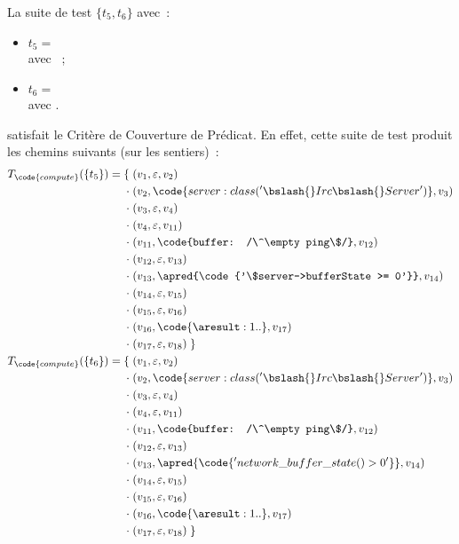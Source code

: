 \begin{example}

La suite de test $\{t_5, t_6\}$ avec~:
%
\begin{itemize}

\item
$t_5 =$  \\
avec ~;

\item
$t_6 =$  \\
avec .

\end{itemize}
%
satisfait le Critère de Couverture de Prédicat. En effet, cette suite de test
produit les chemins suivants (sur les sentiers)~:
%
\begin{align*}
%
T_\code{compute}(\{t_5\}) = \{\;
          & (v_1, \varepsilon, v_2) \\
  \cdot\; & (v_2, \code{server: class('\bslash{}Irc\bslash{}Server')}, v_3) \\
  \cdot\; & (v_3, \varepsilon, v_4) \\
  \cdot\; & (v_4, \varepsilon, v_{11}) \\
  \cdot\; & (v_{11}, \code{buffer: /\^\empty ping\$/}, v_{12}) \\
  \cdot\; & (v_{12}, \varepsilon, v_{13}) \\
  \cdot\; & (v_{13}, \apred{\code{'\$server->bufferState >= 0'}}, v_{14}) \\
  \cdot\; & (v_{14}, \varepsilon, v_{15}) \\
  \cdot\; & (v_{15}, \varepsilon, v_{16}) \\
  \cdot\; & (v_{16}, \code{\aresult: 1..}, v_{17}) \\
  \cdot\; & (v_{17}, \varepsilon, v_{18}) \;\} \\
%
T_\code{compute}(\{t_6\}) = \{\;
          & (v_1, \varepsilon, v_2) \\
  \cdot\; & (v_2, \code{server: class('\bslash{}Irc\bslash{}Server')}, v_3) \\
  \cdot\; & (v_3, \varepsilon, v_4) \\
  \cdot\; & (v_4, \varepsilon, v_{11}) \\
  \cdot\; & (v_{11}, \code{buffer: /\^\empty ping\$/}, v_{12}) \\
  \cdot\; & (v_{12}, \varepsilon, v_{13}) \\
  \cdot\; & (v_{13}, \apred{\code{'network\_buffer\_state() > 0'}}, v_{14}) \\
  \cdot\; & (v_{14}, \varepsilon, v_{15}) \\
  \cdot\; & (v_{15}, \varepsilon, v_{16}) \\
  \cdot\; & (v_{16}, \code{\aresult: 1..}, v_{17}) \\
  \cdot\; & (v_{17}, \varepsilon, v_{18}) \;\} \\
%
\end{align*}

\end{example}

